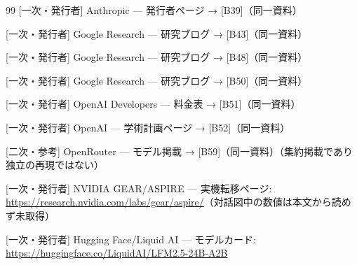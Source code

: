 \documentclass[lualatex,a4paper,10pt]{jlreq}
\begin{document}
\begin{thebibliography}{99}
 [一次・発行者] Anthropic — 発行者ページ → [B39]（同一資料）

 [一次・発行者] Google Research — 研究ブログ → [B43]（同一資料）

 [一次・発行者] Google Research — 研究ブログ → [B48]（同一資料）

 [一次・発行者] Google Research — 研究ブログ → [B50]（同一資料）

 [一次・発行者] OpenAI Developers — 料金表 → [B51]（同一資料）

 [一次・発行者] OpenAI — 学術計画ページ → [B52]（同一資料）

 [二次・参考] OpenRouter — モデル掲載 → [B59]（同一資料）（集約掲載であり独立の再現ではない）

 [一次・発行者] NVIDIA GEAR/ASPIRE — 実機転移ページ: \url{https://research.nvidia.com/labs/gear/aspire/}（対話図中の数値は本文から読めず未取得）

 [一次・発行者] Hugging Face/Liquid AI — モデルカード: \url{https://huggingface.co/LiquidAI/LFM2.5-24B-A2B}

\end{thebibliography}
\end{document}
